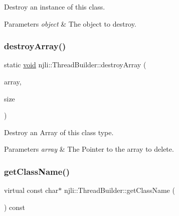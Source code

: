 Destroy an instance of this class.


\begin{DoxyParams}{Parameters}
{\em object} & The object to destroy. \\
\hline
\end{DoxyParams}
\mbox{\label{classnjli_1_1_thread_builder_a3206de9874c908cc6c0700781f04d5d0}} 
\subsubsection{\texorpdfstring{destroy\+Array()}{destroyArray()}}
{\footnotesize\ttfamily static \mbox{\hyperlink{_thread_8h_af1e856da2e658414cb2456cb6f7ebc66}{void}} njli\+::\+Thread\+Builder\+::destroy\+Array (\begin{DoxyParamCaption}\item[{\mbox{\hyperlink{classnjli_1_1_thread_builder}{Thread\+Builder}} $\ast$$\ast$}]{array,  }\item[{const \mbox{\hyperlink{_util_8h_a10e94b422ef0c20dcdec20d31a1f5049}{u32}}}]{size }\end{DoxyParamCaption})\hspace{0.3cm}{\ttfamily [static]}}

Destroy an Array of this class type.


\begin{DoxyParams}{Parameters}
{\em array} & The Pointer to the array to delete. \\
\hline
\end{DoxyParams}
\mbox{\label{classnjli_1_1_thread_builder_ad7ee70d967c641bed56ed5e5c4b1eed7}} 
\subsubsection{\texorpdfstring{get\+Class\+Name()}{getClassName()}}
{\footnotesize\ttfamily virtual const char$\ast$ njli\+::\+Thread\+Builder\+::get\+Class\+Name (\begin{DoxyParamCaption}{ }\end{DoxyParamCaption}) const\hspace{0.3cm}{\ttfamily [virtual]}}

